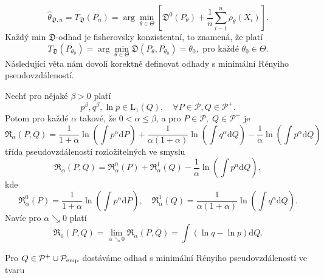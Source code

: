 \begin{equation}
	\hat{\theta}_{\mathfrak{D},n} =T_\mathfrak{D}(P_n)  = \arg\min_{\theta \in \Theta}\left[ \mathfrak{D}^0(P_\theta) + \dfrac{1}{n} \sum_{i-1}^n \rho_\theta (X_i) \right].
\end{equation}
Každý min $\mathfrak{D}$-odhad je fisherovsky konzistentní, to znamená, že platí
\begin{equation}
	T_\mathfrak{D}(P_{\theta_0}) = \arg\min_{\theta \in \Theta} \mathfrak{D}(P_\theta, P_{\theta_0}) = \theta_0,\text{ pro každé }\theta_0 \in \Theta.
\end{equation}
Následující věta nám dovolí korektně definovat odhady s minimální Rényiho pseudovzdáleností.
\begin{theorem}
Nechť pro nějaké $\beta>0$ platí
	\begin{equation}
			p^\beta, q^\beta,\ln{p} \in \mathrm{L}_1(Q), \quad \forall P \in \mathcal{P}, Q \in \mathcal{P^+}.
			\label{beta-podminka}
	\end{equation}
	Potom pro každé $\alpha$ takové, že $0 < \alpha \leq \beta$, a pro $P \in \mathcal{P}, \; Q \in \mathcal{P^+} $ je 
	\begin{equation}
		\mathfrak{R}_\alpha (P,Q) = \dfrac{1}{1+\alpha}\ln{\left( \int{p^\alpha \mathrm{d}P } \right)} +
		\dfrac{1}{\alpha (1+\alpha)}\ln{\left( \int{q^\alpha \mathrm{d}Q } \right)} -
		\dfrac{1}{\alpha} \ln{\left( \int{p^\alpha \mathrm{d}Q } \right)}
	\end{equation}
	třída pseudovzdáleností rozložitelných ve smyslu 
	\begin{equation*}
		\mathfrak{R}_\alpha (P,Q) = \mathfrak{R}_\alpha^0 (P) + \mathfrak{R}_\alpha^1 (Q) - \dfrac{1}{\alpha} \ln{\left( \int{p^\alpha \mathrm{d}Q } \right)},
	\end{equation*}	
	kde 
	\begin{equation*}
		\mathfrak{R}_\alpha^0 (P) = \dfrac{1}{1+\alpha}\ln{\left( \int{p^\alpha \mathrm{d}P } \right)}, \quad \mathfrak{R}_\alpha^1 (Q) = \dfrac{1}{\alpha (1+\alpha)}\ln{\left( \int{q^\alpha \mathrm{d}Q } \right)}.
	\end{equation*}
	Navíc pro $\alpha \searrow 0$ platí
	\begin{equation*}
		\mathfrak{R}_0 (P,Q) = \lim_{\alpha \searrow 0} \mathfrak{R}_\alpha (P,Q) =  \int{\left( \ln{q} - \ln{p} \right)\mathrm{d}Q}.
	\end{equation*}
\end{theorem}
Pro $Q \in \mathcal{P}^+ \cup \mathcal{P}_\mathrm{emp}$ dostáváme odhad s minimální Rényiho pseudovzdáleností ve tvaru
